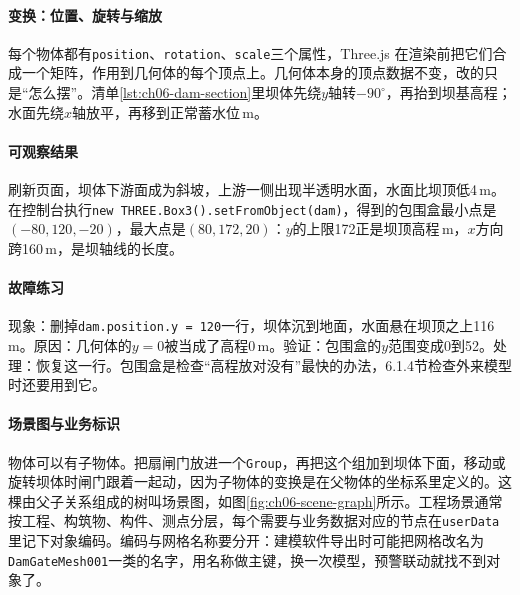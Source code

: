 \paragraph{变换：位置、旋转与缩放}每个物体都有\texttt{position}、\texttt{rotation}、\texttt{scale}三个属性，Three.js 在渲染前把它们合成一个矩阵，作用到几何体的每个顶点上。几何体本身的顶点数据不变，改的只是“怎么摆”。清单\ref{lst:ch06-dam-section}里坝体先绕$y$轴转$-90^\circ$，再抬到坝基高程；水面先绕$x$轴放平，再移到正常蓄水位\cpNormalLevel\,m。

\paragraph{可观察结果}刷新页面，坝体下游面成为斜坡，上游一侧出现半透明水面，水面比坝顶低4\,m。在控制台执行\texttt{new THREE.Box3().setFromObject(dam)}，得到的包围盒最小点是$(-80,120,-20)$，最大点是$(80,172,20)$：$y$的上限172正是坝顶高程\cpCrestElev\,m，$x$方向跨160\,m，是坝轴线的长度。

\paragraph{故障练习}现象：删掉\texttt{dam.position.y = 120}一行，坝体沉到地面，水面悬在坝顶之上116\,m。原因：几何体的$y=0$被当成了高程0\,m。验证：包围盒的$y$范围变成0到52。处理：恢复这一行。包围盒是检查“高程放对没有”最快的办法，6.1.4节检查外来模型时还要用到它。

\paragraph{场景图与业务标识}物体可以有子物体。把\cpGateCount 扇闸门放进一个\texttt{Group}，再把这个组加到坝体下面，移动或旋转坝体时闸门跟着一起动，因为子物体的变换是在父物体的坐标系里定义的。这棵由父子关系组成的树叫场景图，如图\ref{fig:ch06-scene-graph}所示。工程场景通常按工程、构筑物、构件、测点分层，每个需要与业务数据对应的节点在\texttt{userData}里记下对象编码。编码与网格名称要分开：建模软件导出时可能把网格改名为\texttt{DamGateMesh001}一类的名字，用名称做主键，换一次模型，预警联动就找不到对象了。

